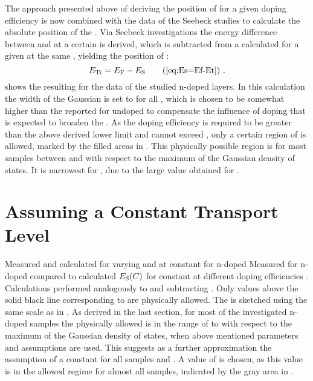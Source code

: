 The approach presented above of deriving the position of \Ef for a given doping efficiency \DopEff is now combined with the data of the Seebeck studies to calculate the absolute position of the \EtLong \Et. Via Seebeck investigations the energy difference \Es between \Ef and \Et at a certain \CLong is derived, which is subtracted from a calculated \Ef for a given \DopEff at the same \C, yielding the position of \Et:
\begin{equation}
\Et = \Ef-\Es \tag{\ref{eq:Es=Ef-Et}}
\PUNKT
\end{equation}
 shows the resulting \Et for the data of the studied n-doped \CS layers.
%
In this calculation the width of the Gaussian \dos is set to \gausswidth[100] for all \C, which is chosen to be somewhat higher than the reported \gausswidth[88]\cite{Fishchuk2010} for undoped \CS to compensate the influence of doping that is expected to broaden the \dos.
As the doping efficiency is required to be greater than the above derived lower limit \DopEffLL and cannot exceed \DopEff[100], only a certain region of \Et is allowed, marked by the filled areas in . This physically possible region is for most samples between  and  with respect to the maximum of the Gaussian density of states. It is narrowest for \CrPd, due to the large value obtained for \DopEffLL.

\section{Assuming a Constant Transport Level}\label{sec:rechConstEt}
%
%
{Measured and calculated \EsLong for varying \CLong and \DopEffLong at constant \Et for n-doped \CS}
{Measured \EsLong \Es for n-doped \CS compared to calculated $\Es(\C)$ for constant \EtLong \Et[-225] at different doping efficiencies \DopEff. Calculations performed analogously to  and subtracting \Et. Only values above the solid black line corresponding to \DopEff[100] are physically allowed. The \dos is sketched using the same scale as in .
}
%
As derived in the last section, for most of the investigated n-doped samples the physically allowed \EtLong is in the range of \Et[-300] to  with respect to the maximum of the Gaussian density of states, when above mentioned parameters and assumptions are used. This suggests as a further approximation the assumption of a constant \EtLong for all samples and \CLongs. A value of \Et[-225] is chosen, as this value is in the allowed regime for almost all samples, indicated by the gray area in .

